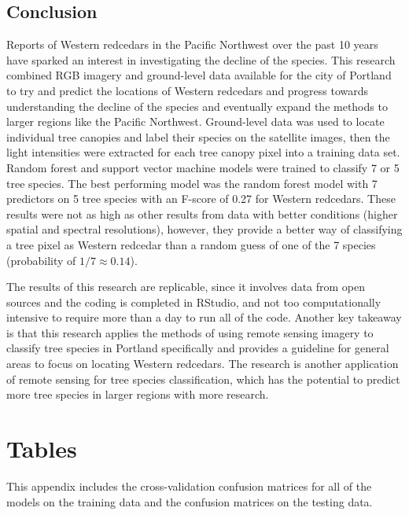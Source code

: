 \documentclass[12pt,twoside]{reedthesis}
\begin{document}
\hypertarget{conclusion}{%
\section{Conclusion}\label{conclusion}}

Reports of Western redcedars in the Pacific Northwest over the past 10 years have sparked an interest in investigating the decline of the species. This research combined RGB imagery and ground-level data available for the city of Portland to try and predict the locations of Western redcedars and progress towards understanding the decline of the species and eventually expand the methods to larger regions like the Pacific Northwest. Ground-level data was used to locate individual tree canopies and label their species on the satellite images, then the light intensities were extracted for each tree canopy pixel into a training data set. Random forest and support vector machine models were trained to classify 7 or 5 tree species. The best performing model was the random forest model with 7 predictors on 5 tree species with an F-score of 0.27 for Western redcedars. These results were not as high as other results from data with better conditions (higher spatial and spectral resolutions), however, they provide a better way of classifying a tree pixel as Western redcedar than a random guess of one of the 7 species (probability of \(1/7 \approx 0.14\)).

The results of this research are replicable, since it involves data from open sources and the coding is completed in RStudio, and not too computationally intensive to require more than a day to run all of the code. Another key takeaway is that this research applies the methods of using remote sensing imagery to classify tree species in Portland specifically and provides a guideline for general areas to focus on locating Western redcedars. The research is another application of remote sensing for tree species classification, which has the potential to predict more tree species in larger regions with more research.

\appendix

\hypertarget{tables}{%
\chapter{Tables}\label{tables}}

This appendix includes the cross-validation confusion matrices for all of the models on the training data and the confusion matrices on the testing data.
\end{document}
